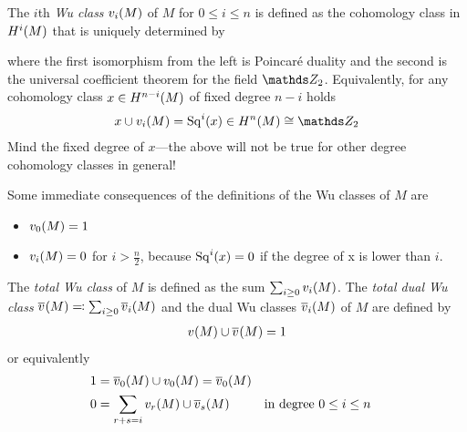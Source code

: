 \begin{Def}\label{def:wuclasses}
  The $i$th \emph{Wu class} ${v_{i}}(M)$ of $M$ for $0\leq i\leq n$ is defined
  as the cohomology class in $H^i(M)$ that is uniquely determined by
  \begin{center}
  \end{center}
  where the first isomorphism from the left is Poincaré duality %
  and the second is the universal coefficient theorem %
  for the field $\Zmod2$.
  Equivalently, for any cohomology class $x\in H^{n-i}(M)$ of fixed
  degree $n-i$ holds
  \begin{gather*}
    x\cup \v{i}{M} = \Sq i(x) \in \H^n(M) \cong \Zmod2
  \end{gather*}
  Mind the fixed degree of $x$---the above will not be true for other
  degree cohomology classes in general!
\end{Def}

\begin{Rem}
  Some immediate consequences of the definitions of the Wu classes of
  $M$ are
  \begin{itemize}
  \item ${v_{0}}(M) = 1$
  \item ${v_{i}}(M) = 0$ for $i>\frac n 2$, because $\mathrm{Sq}^{i}(x) = 0$ if the
    degree of x is lower than $i$.
  \end{itemize}
\end{Rem}


\begin{Def}
  The \emph{total Wu class} of $M$ is defined as the sum
  $\sum_{i\geq0}{v_{i}}(M)$. The \emph{total dual Wu class}
  ${\overline{v}_{}}(M)\eqqcolon \sum_{i\geq 0}{\overline{v}_{i}}(M)$
  and the dual Wu classes ${\overline{v}_{i}}(M)$
  of $M$ are defined by
  \begin{gather*}
    {v_{}}(M) \cup {\overline{v}_{}}(M) = 1
  \end{gather*}
  or equivalently
  \begin{align*}
    1 &= {\overline{v}_{0}}(M) \cup {v_{0}}(M) = {\overline{v}_{0}}(M) \\
    0 &= \sum_{r+s=i}{v_{r}}(M)\cup{\overline{v}_{s}}(M)
      &&\text{in degree $0\leq i\leq n$}
  \end{align*}
\end{Def}

